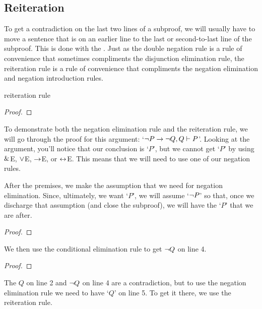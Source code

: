 

\subsection{Reiteration}

To get a contradiction on the last two lines of a subproof, we will usually have to move a sentence that is on an earlier line to the last or second-to-last line of the subproof. This is done with the . Just as the double negation rule is a rule of convenience that sometimes compliments the disjunction elimination rule, the reiteration rule is a rule of convenience that compliments the negation elimination and negation introduction rules.  

\begin{factboxy-width}[width=7.5cm]{reiteration rule}
\begin{proof}
	 
\end{proof}
\end{factboxy-width}

To demonstrate both the negation elimination rule and the reiteration rule, we will go through the proof for this argument: `${\neg} P \rightarrow {\neg} Q, Q \vdash P$'. Looking at the argument, you'll notice that our conclusion is `$P$', but we cannot get `$P$' by using $\mathbin{\&}$E, $\vee$E, $\rightarrow$E, or $\leftrightarrow$E. This means that we will need to use one of our negation rules.

After the premises, we make the assumption that we need for negation elimination. Since, ultimately, we want `$P$', we will assume `${\neg} P$' so that, once we discharge that assumption (and close the subproof), we will have the `$P$' that we are after.

\begin{proof}
	 \pr{}	
	 \pr{}
	\open
		\as{}
\end{proof}
We then use the conditional elimination rule to get ${\neg} Q$ on line 4. 
\begin{proof}
	 \pr{}	
	 \pr{}
	\open
		\as{}
\end{proof}
The $Q$ on line 2 and ${\neg} Q$ on line 4 are a contradiction, but to use the negation elimination rule we need to have `$Q$' on line 5. To get it there, we use the reiteration rule. 

